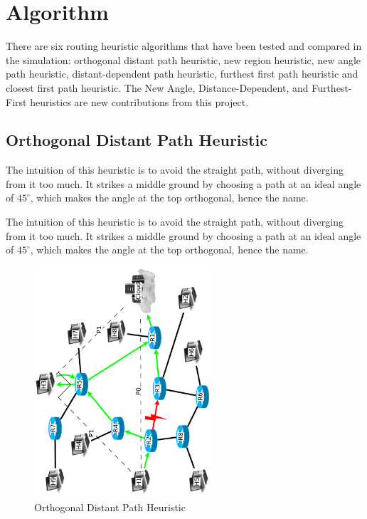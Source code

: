 \documentclass[conference]{IEEEtran}
\begin{document}


\section{Algorithm}
There are six routing heuristic algorithms that have been tested and compared in the simulation: orthogonal distant path heuristic, new region heuristic, new angle path heuristic, distant-dependent path heuristic, furthest first path heuristic and closest first path heuristic.
The New Angle, Distance-Dependent, and Furthest-First heuristics are new contributions from this project.

%
\subsection{Orthogonal Distant Path Heuristic}
The intuition of this heuristic is to avoid the straight path, without diverging from it too much.  It strikes a middle ground by choosing a path at an ideal angle of $45^{\circ}$, which makes the angle at the top orthogonal, hence the name.
\begin{algorithm}
\DontPrintSemicolon
{}
\SetAlgoLined
\SetAlgoLongEnd
\scriptsize
{}
\caption{The intuition of this heuristic is to avoid the straight path, without diverging from it too much.  It strikes a middle ground by choosing a path at an ideal angle of $45^{\circ}$, which makes the angle at the top orthogonal, hence the name.}
\small
\end{algorithm}

\begin{figure}[!H]
\centering
\includegraphics[width=2.6in,angle=-90]{../../images/diagrams/angular_path}
\caption{Orthogonal Distant Path Heuristic}
\end{figure}
%
%
\end{document}
